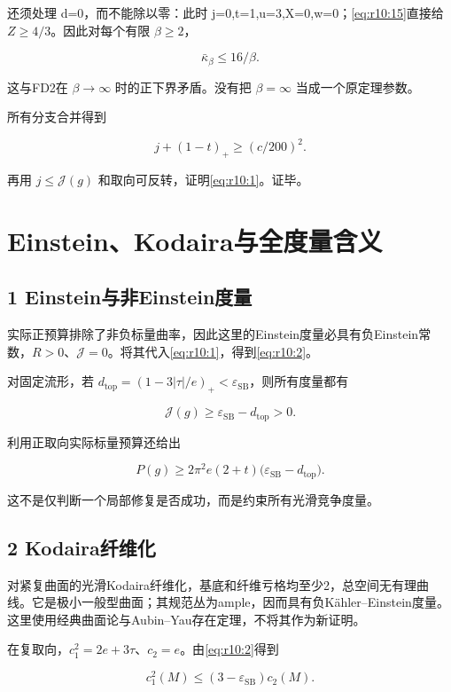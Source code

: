 \documentclass[UTF8,11pt,fontset=none]{ctexart}
\begin{document}
还须处理 d=0，而不能除以零：此时 j=0,t=1,u=3,X=0,w=0；\eqref{eq:r10:15}直接给 \(Z\ge4/3\)。因此对每个有限 \(\beta\ge2\)，

\[
\bar\kappa_\beta\le16/\beta.
\]

这与FD2在 \(\beta\to\infty\) 时的正下界矛盾。没有把 \(\beta=\infty\) 当成一个原定理参数。

所有分支合并得到

\[
j+(1-t)_+\ge(c/200)^2.
\]

再用 \(j\le\mathcal J(g)\) 和取向可反转，证明\eqref{eq:r10:1}。证毕。

\section{Einstein、Kodaira与全度量含义}\label{ch10:einsteinkodairaux4e0eux5168ux5ea6ux91cfux542bux4e49}

\subsection{1 Einstein与非Einstein度量}\label{ch10:einsteinux4e0eux975eeinsteinux5ea6ux91cf}

实际正预算排除了非负标量曲率，因此这里的Einstein度量必具有负Einstein常数，\(R>0\)、\(\mathcal J=0\)。将其代入\eqref{eq:r10:1}，得到\eqref{eq:r10:2}。

对固定流形，若 \(d_{\mathrm{top}}=(1-3|\tau|/e)_+<\varepsilon_{\mathrm{SB}}\)，则所有度量都有

\[
\mathcal J(g)\ge\varepsilon_{\mathrm{SB}}-d_{\mathrm{top}}>0.
\]

利用正取向实际标量预算还给出

\[
P(g)\ge2\pi^2 e(2+t)
\bigl(\varepsilon_{\mathrm{SB}}-d_{\mathrm{top}}\bigr).
\]

这不是仅判断一个局部修复是否成功，而是约束所有光滑竞争度量。

\subsection{2 Kodaira纤维化}\label{ch10:kodairaux7ea4ux7ef4ux5316}

对紧复曲面的光滑Kodaira纤维化，基底和纤维亏格均至少2，总空间无有理曲线。它是极小一般型曲面；其规范丛为ample，因而具有负Kähler--Einstein度量。这里使用经典曲面论与Aubin--Yau存在定理，不将其作为新证明。

在复取向，\(c_1^2=2e+3\tau\)、\(c_2=e\)。由\eqref{eq:r10:2}得到

\[
\boxed{c_1^2(M)\le(3-\varepsilon_{\mathrm{SB}})c_2(M).}
\tag{10.22}\label{eq:r10:22}
\]
\end{document}
